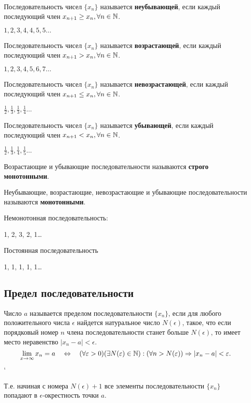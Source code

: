Последовательность чисел $\{x_{n}\}$ называется \textbf{неубывающей}, если каждый последующий член $x_{n+1} \ge x_{n}, \forall n\in \mathbb{N}$.
\begin{eg}
  $1, 2, 3, 4, 4, 5, 5\ldots$
\end{eg}

Последовательность чисел $\{x_{n}\} $ называется \textbf{возрастающей}, если каждый последующий член $x_{n+1} > x_{n}, \forall n \in \mathbb{N}$.
\begin{eg}
  $1, 2, 3, 4, 5, 6, 7\ldots$
\end{eg}

Последовательность чисел $\{x_{n}\} $ называется \textbf{невозрастающей}, если каждый последующий член $x_{n+1} \le x_{n}, \forall n \in \mathbb{N}$.
\begin{eg}
  $\frac{1}{2}, \frac{1}{3}, \frac{1}{3}, \frac{1}{4}\ldots $
\end{eg}

Последовательность чисел $\{x_{n}\} $ называется \textbf{убывающей}, если каждый последующий член $x_{n+1} < x_{n}, \forall n \in \mathbb{N}$.
\begin{eg}
  $\frac{1}{2}, \frac{1}{3}, \frac{1}{4}, \frac{1}{5}\ldots$
\end{eg}

Возрастающие и убывающие последовательности называются \textbf{строго монотонными}.

Неубывающие, возрастающие, невозрастающие и убывающие последовательности называются \textbf{монотонными}.

Немонотонная последовательность:
\begin{eg}
  1, 2, 3, 2, 1\ldots
\end{eg}

Постоянная последовательность
\begin{eg}
  1, 1, 1, 1, 1\ldots
\end{eg}

\subsection{Предел последовательности}

\begin{definition}
Число $a$ называется пределом последовательности $\{x_{n}\} $, если для любого положительного числа $\epsilon$ найдется натуральное число  $N\left(\epsilon  \right) $, такое, что если порядковый номер $n$ члена последовательности станет больше $N(\epsilon)$, то имеет место неравенство  $|x_{n} - a| < \epsilon$.
\[
\lim_{x \to \infty} x_{n} = a \quad \iff \quad
(\forall \epsilon > 0)(\exists N(\epsilon) \in \N) : (\forall n > N(\epsilon)) \implies |x_{n}-a| < \epsilon
.\] `
\end{definition}
\begin{note}
  Т.е. начиная с номера $N(\epsilon) + 1$ все элементы последовательности $\{x_{n}\} $ попадают в $\epsilon$-окрестность точки $a$.
\end{note}

